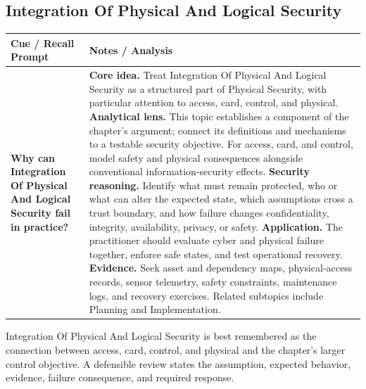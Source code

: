 \documentclass[11pt]{article}
\newcommand{\CornellHeader}{%
\rowcolor{Navy}\color{white}\bfseries Cue / Recall Prompt & \color{white}\bfseries Notes / Analysis\\\hline}
\newcommand{\CornellRow}[2]{%
\cellcolor{CueGray}\RaggedRight\textbf{#1} & \RaggedRight #2\\\hline}
\begin{document}
\subsection*{Integration Of Physical And Logical Security}
\begin{longtable}{>{\RaggedRight\arraybackslash}p{}|>{\RaggedRight\arraybackslash}p{}}
\CornellHeader
\CornellRow{Why can Integration Of Physical And Logical Security fail in practice?}{\textbf{Core idea.} Treat Integration Of Physical And Logical Security as a structured part of Physical Security, with particular attention to access, card, control, and physical. \textbf{Analytical lens.} This topic establishes a component of the chapter's argument; connect its definitions and mechanisms to a testable security objective. For access, card, and control, model safety and physical consequences alongside conventional information-security effects. \textbf{Security reasoning.} Identify what must remain protected, who or what can alter the expected state, which assumptions cross a trust boundary, and how failure changes confidentiality, integrity, availability, privacy, or safety. \textbf{Application.} The practitioner should evaluate cyber and physical failure together, enforce safe states, and test operational recovery. \textbf{Evidence.} Seek asset and dependency maps, physical-access records, sensor telemetry, safety constraints, maintenance logs, and recovery exercises. Related subtopics include Planning and Implementation.}
\end{longtable}
\begin{topicsummary}
Integration Of Physical And Logical Security is best remembered as the connection between access, card, control, and physical and the chapter's larger control objective. A defensible review states the assumption, expected behavior, evidence, failure consequence, and required response.
\end{topicsummary}
\end{document}
